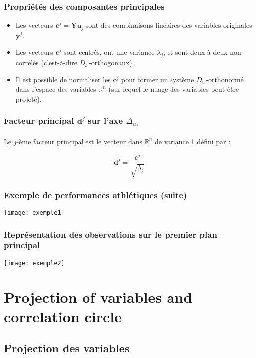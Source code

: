 \documentclass[10pt,a4paper]{article}
\begin{document}
\subsubsection*{Propriétés des composantes principales}
\begin{itemize}
    \item Les vecteurs $\mathbf{c}^j = \mathbf{Y} \mathbf{u}_j$ sont des combinaisons linéaires des variables originales $\mathbf{y}^j$.
    \item Les vecteurs $\mathbf{c}^j$ sont centrés, ont une variance $\lambda_j$, et sont deux à deux non corrélés (c'est-à-dire $D_w$-orthogonaux).
    \item Il est possible de normaliser les $\mathbf{c}^j$ pour former un système $D_w$-orthonormé dans l'espace des variables $\mathbb{R}^n$ (sur lequel le nuage des variables peut être projeté).
\end{itemize}

\subsubsection*{Facteur principal $\mathbf{d}^j$ sur l'axe $\Delta_{u_j}$}
Le $j$-ème facteur principal est le vecteur dans $\mathbb{R}^n$ de variance 1 défini par :

\[
\mathbf{d}^j = \frac{\mathbf{c}^j}{\sqrt{\lambda_j}}
\]

\subsubsection*{Exemple de performances athlétiques (suite)}
\texttt{[image: exemple1]}

\subsubsection*{Représentation des observations sur le premier plan principal}
\texttt{[image: exemple2]}

\section*{Projection of variables and correlation circle}

\subsection*{Projection des variables}
\end{document}
